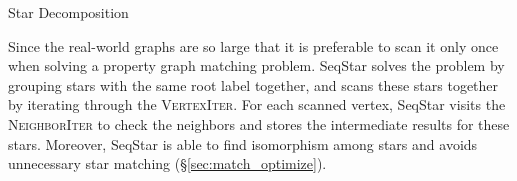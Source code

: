 \begin{algorithm}[ht]
  \caption{Star Decomposition}\label{alg:decompose_stars}
\end{algorithm}

Since the real-world graphs are so large that it is preferable to scan it only once when solving a property graph matching problem.
SeqStar solves the problem by grouping stars with the same root label together,
and scans these stars together by iterating through the \textsc{VertexIter}.
For each scanned vertex, SeqStar visits the \textsc{NeighborIter} to check the neighbors and stores the intermediate results for these stars.
Moreover, SeqStar is able to find isomorphism among stars and avoids unnecessary star matching (\S\ref{sec:match_optimize}).
